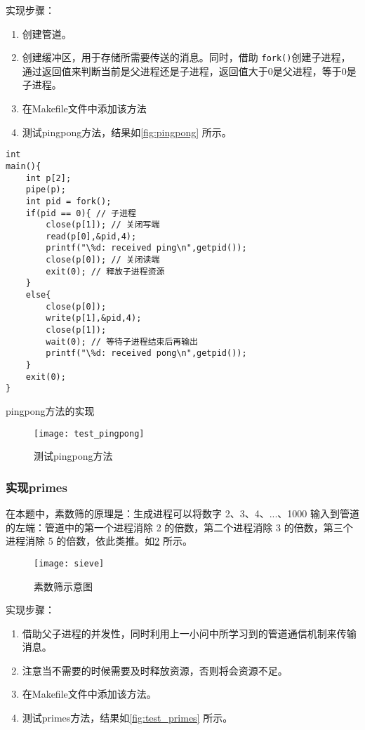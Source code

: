 实现步骤：
\begin{enumerate}
	\item 创建管道。
	\item 创建缓冲区，用于存储所需要传送的消息。同时，借助 \texttt{fork()}创建子进程，通过返回值来判断当前是父进程还是子进程，返回值大于0是父进程，等于0是子进程。
	\item 在Makefile文件中添加该方法
	\item 测试pingpong方法，结果如\cref{fig:pingpong} 所示。
\end{enumerate}

\begin{listing}[!htb]
	\begin{verbatim}
int
main(){
    int p[2];
    pipe(p); 
    int pid = fork();
    if(pid == 0){ // 子进程
        close(p[1]); // 关闭写端
        read(p[0],&pid,4);
        printf("\%d: received ping\n",getpid());
        close(p[0]); // 关闭读端
        exit(0); // 释放子进程资源
    }
    else{
        close(p[0]);
        write(p[1],&pid,4);
        close(p[1]);
        wait(0); // 等待子进程结束后再输出
        printf("\%d: received pong\n",getpid());
    }
    exit(0);
}
	\end{verbatim}
	\caption{pingpong方法的实现}\label{lst:test_pingpong}
\end{listing}

\begin{figure}[!htb]
	\centering
	\texttt{[image: test\_pingpong]}
	\caption{测试pingpong方法}
	\label{fig:test_pingpong}
\end{figure}

\subsubsection{实现primes}

在本题中，素数筛的原理是：生成进程可以将数字 2、3、4、...、1000 输入到管道的左端：管道中的第一个进程消除 2 的倍数，第二个进程消除 3 的倍数，第三个进程消除 5 的倍数，依此类推。如\cref{fig:sieve} 所示。

\begin{figure}[!htb]
	\centering
	\texttt{[image: sieve]}
	\caption{素数筛示意图}
	\label{fig:sieve}
\end{figure}

实现步骤：
\begin{enumerate}
	\item 借助父子进程的并发性，同时利用上一小问中所学习到的管道通信机制来传输消息。
	\item 注意当不需要的时候需要及时释放资源，否则将会资源不足。
	\item 在Makefile文件中添加该方法。
	\item 测试primes方法，结果如\cref{fig:test_primes} 所示。
\end{enumerate}

